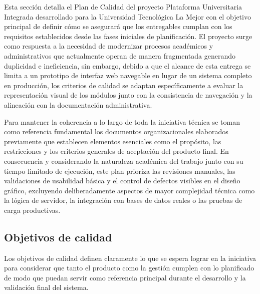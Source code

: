 \documentclass[11pt,spanish]{article}
\begin{document}
Esta sección detalla el Plan de Calidad del proyecto Plataforma Universitaria Integrada desarrollado para la Universidad Tecnológica La Mejor con el objetivo principal de definir cómo se asegurará que los entregables cumplan con los requisitos establecidos desde las fases iniciales de planificación. El proyecto surge como respuesta a la necesidad de modernizar procesos académicos y administrativos que actualmente operan de manera fragmentada generando duplicidad e ineficiencia, sin embargo, debido a que el alcance de esta entrega se limita a un prototipo de interfaz web navegable en lugar de un sistema completo en producción, los criterios de calidad se adaptan específicamente a evaluar la representación visual de los módulos junto con la consistencia de navegación y la alineación con la documentación administrativa.

Para mantener la coherencia a lo largo de toda la iniciativa técnica se toman como referencia fundamental los documentos organizacionales elaborados previamente que establecen elementos esenciales como el propósito, las restricciones y los criterios generales de aceptación del producto final. En consecuencia y considerando la naturaleza académica del trabajo junto con su tiempo limitado de ejecución, este plan prioriza las revisiones manuales, las validaciones de usabilidad básica y el control de defectos visibles en el diseño gráfico, excluyendo deliberadamente aspectos de mayor complejidad técnica como la lógica de servidor, la integración con bases de datos reales o las pruebas de carga productivas.

\subsection{Objetivos de calidad}

Los objetivos de calidad definen claramente lo que se espera lograr en la iniciativa para considerar que tanto el producto como la gestión cumplen con lo planificado de modo que puedan servir como referencia principal durante el desarrollo y la validación final del sistema.
\end{document}
